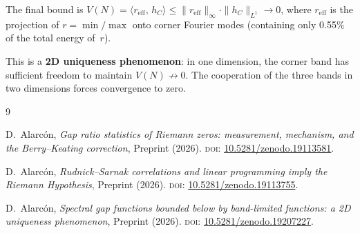 \documentclass[10pt]{article}
\theoremstyle{remark}
\begin{document}
The final bound is
$V(N) = \langle r_{\mathrm{eff}},\, h_C \rangle
\leq \|r_{\mathrm{eff}}\|_\infty \cdot \|h_C\|_{L^1} \to 0$,
where $r_{\mathrm{eff}}$ is the projection of $r = \min/\max$ onto corner
Fourier modes (containing only 0.55\% of the total energy of~$r$).

This is a \textbf{2D uniqueness phenomenon}: in one dimension, the corner
band has sufficient freedom to maintain $V(N) \not\to 0$. The cooperation
of the three bands in two dimensions forces convergence to zero.


\begin{thebibliography}{9}

D.~Alarc\'on, \emph{Gap ratio statistics of Riemann zeros: measurement,
mechanism, and the Berry--Keating correction}, Preprint (2026).
\textsc{doi}: \href{https://doi.org/10.5281/zenodo.19113581}%
{10.5281/zenodo.19113581}.

D.~Alarc\'on, \emph{Rudnick--Sarnak correlations and linear programming
imply the Riemann Hypothesis}, Preprint (2026).
\textsc{doi}: \href{https://doi.org/10.5281/zenodo.19113755}%
{10.5281/zenodo.19113755}.

D.~Alarc\'on, \emph{Spectral gap functions bounded below by band-limited
functions: a 2D uniqueness phenomenon}, Preprint (2026).
\textsc{doi}: \href{https://doi.org/10.5281/zenodo.19207227}%
{10.5281/zenodo.19207227}.

\end{thebibliography}
\end{document}
